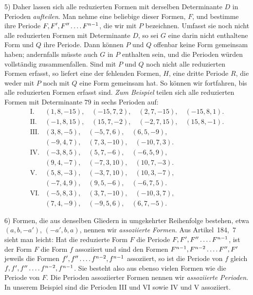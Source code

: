 5) Daher lassen sich alle reduzierten Formen mit derselben Determinante $D$ in Perioden \textit{aufteilen}. Man nehme eine beliebige dieser Formen, $F$, und bestimme ihre Periode $F,F',F''\mathinner{\ldotp\ldotp\ldotp\ldotp} F^{n-1}$, die wir mit $P$ bezeichnen. Umfasst sie noch nicht alle reduzierten Formen mit Determinante $D$, so sei $G$ eine darin nicht enthaltene Form und $Q$ ihre Periode. Dann können $P$ und $Q$ offenbar keine Form gemeinsam haben; andernfalls müsste auch $G$ in $P$ enthalten sein, und die Perioden würden vollständig zusammenfallen. Sind mit $P$ und $Q$ noch nicht alle reduzierten Formen erfasst, so liefert eine der fehlenden Formen, $H$, eine dritte Periode $R$, die weder mit $P$ noch mit $Q$ eine Form gemeinsam hat. So können wir fortfahren, bis alle reduzierten Formen erfasst sind. \textit{Zum Beispiel} teilen sich alle reduzierten Formen mit Determinante $79$ in sechs Perioden auf:
\[
\begin{array}{rl}
\mathrm{I.}&(1,8,-15),\quad (-15,7,2),\quad (2,7,-15),\quad (-15,8,1).\\
\mathrm{II.}&(-1,8,15),\quad (15,7,-2),\quad (-2,7,15),\quad (15,8,-1).\\
\mathrm{III.}&(3,8,-5),\quad (-5,7,6),\quad (6,5,-9),\\
&(-9,4,7),\quad (7,3,-10),\quad (-10,7,3).\\
\mathrm{IV.}&(-3,8,5),\quad (5,7,-6),\quad (-6,5,9),\\
&(9,4,-7),\quad (-7,3,10),\quad (10,7,-3).\\
\mathrm{V.}&(5,8,-3),\quad (-3,7,10),\quad (10,3,-7),\\
&(-7,4,9),\quad (9,5,-6),\quad (-6,7,5).\\
\mathrm{VI.}&(-5,8,3),\quad (3,7,-10),\quad (-10,3,7),\\
&(7,4,-9),\quad (-9,5,6),\quad (6,7,-5).
\end{array}
\]

6) Formen, die aus denselben Gliedern in umgekehrter Reihenfolge bestehen, etwa $(a,b,-a')$, $(-a',b,a)$, nennen wir \textit{assoziierte Formen}. Aus Artikel~184,~7 sieht man leicht: Hat die reduzierte Form $F$ die Periode $F,F',F''\mathinner{\ldotp\ldotp\ldotp\ldotp} F^{n-1}$, ist der Form $F$ die Form $f$ assoziiert und sind den Formen $F^{n-1},F^{n-2}\mathinner{\ldotp\ldotp\ldotp\ldotp} F'',F'$ jeweils die Formen $f',f''\mathinner{\ldotp\ldotp\ldotp\ldotp} f^{n-2},f^{n-1}$ assoziiert, so ist die Periode von $f$ gleich $f,f',f''\mathinner{\ldotp\ldotp\ldotp\ldotp} f^{n-2},f^{n-1}$. Sie besteht also aus ebenso vielen Formen wie die Periode von $F$. Die Perioden assoziierter Formen nennen wir \textit{assoziierte Perioden}. In unserem Beispiel sind die Perioden III und VI sowie IV und V assoziiert.

